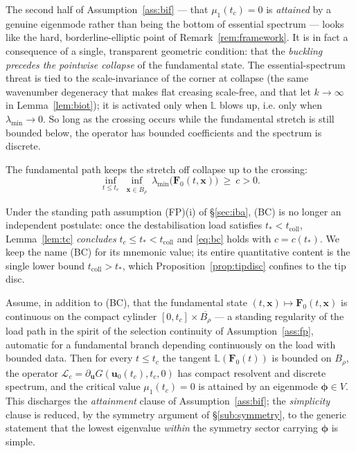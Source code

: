 The second half of Assumption~\ref{ass:bif} --- that $\mu_1(t_c)=0$ is \emph{attained} by a genuine eigenmode rather
than being the bottom of essential spectrum --- looks like the hard, borderline-elliptic point of
Remark~\ref{rem:framework}. It is in fact a consequence of a single, transparent geometric condition: that the
\emph{buckling precedes the pointwise collapse} of the fundamental state. The essential-spectrum threat is tied to the
scale-invariance of the corner at collapse (the same wavenumber degeneracy that makes flat creasing scale-free, and
that let $k\to\infty$ in Lemma~\ref{lem:biot}); it is activated only when $\mathbb{L}$ blows up, i.e. only when
$\lambda_{\min}\to0$. So long as the crossing occurs while the fundamental stretch is still bounded below, the operator
has bounded coefficients and the spectrum is discrete.

\begin{assumption}
    \label{ass:bc}
    The fundamental path keeps the stretch off collapse up to the crossing:
    \begin{equation}
        \label{eq:bc}
        \inf_{t\le t_c}\ \inf_{\bm{x}\in\overline{B_\rho}}\ \lambda_{\min}\big(\bm{F}_0(t,\bm{x})\big)\ \ge\ c>0 .
    \end{equation}
\end{assumption}

\noindent Under the standing path assumption (FP)(i) of \S\ref{sec:iba}, (BC) is no longer an independent postulate:
once the destabilisation load satisfies $t_*<t_{\mathrm{coll}}$, Lemma~\ref{lem:tc} \emph{concludes}
$t_c\le t_*<t_{\mathrm{coll}}$ and \eqref{eq:bc} holds with $c=c(t_*)$. We keep the name (BC) for its mnemonic value;
its entire quantitative content is the single lower bound $t_{\mathrm{coll}}>t_*$, which
Proposition~\ref{prop:tipdisc} confines to the tip disc.

\begin{lemma}
    \label{lem:attain}
    Assume, in addition to \textup{(BC)}, that the fundamental state $(t,\bm x)\mapsto\bm F_0(t,\bm x)$ is continuous on
    the compact cylinder $[0,t_c]\times\overline{B_\rho}$ --- a standing regularity of the load path in the spirit of
    the selection continuity of Assumption~\ref{ass:fp}, automatic for a
    fundamental branch depending continuously on the load with bounded data. Then for every $t\le t_c$ the tangent
    $\mathbb{L}(\bm{F}_0(t))$ is bounded on $B_\rho$, the
    operator $\mathcal{L}_c=\partial_{\bm{u}}G(\bm{u}_0(t_c),t_c,0)$ has compact resolvent and discrete spectrum, and the
    critical value $\mu_1(t_c)=0$ is attained by an eigenmode $\bm{\phi}\in V$. This discharges the
    \emph{attainment} clause of Assumption~\ref{ass:bif}; the \emph{simplicity} clause is reduced, by the symmetry
    argument of \S\ref{sub:symmetry}, to the generic statement that the lowest eigenvalue \emph{within} the symmetry
    sector carrying $\bm{\phi}$ is simple.
\end{lemma}

